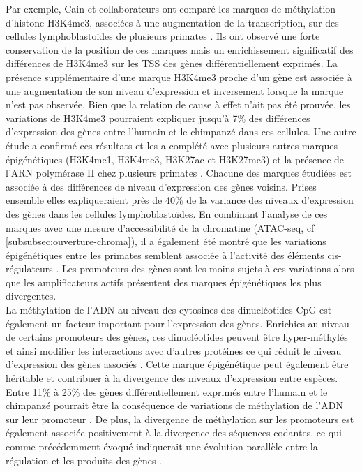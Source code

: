 Par exemple, Cain et collaborateurs ont comparé les marques de méthylation d’histone H3K4me3, associées à une augmentation de la transcription, sur des cellules lymphoblastoïdes de plusieurs primates \citep{cain_gene_2011}. Ils ont observé une forte conservation de la position de ces marques mais un enrichissement significatif des différences de H3K4me3 sur les \acrshort{TSS} des gènes différentiellement exprimés. La présence supplémentaire d’une marque H3K4me3 proche d’un gène est associée à une augmentation de son niveau d’expression et inversement lorsque la marque n’est pas observée. Bien que la relation de cause à effet n'ait pas été prouvée, les variations de H3K4me3 pourraient expliquer jusqu’à 7\% des différences d’expression des gènes entre l’humain et le chimpanzé dans ces cellules. Une autre étude a confirmé ces résultats et les a complété avec plusieurs autres marques épigénétiques (H3K4me1, H3K4me3, H3K27ac et H3K27me3) et la présence de l’ARN polymérase II chez plusieurs primates \citep{zhou_epigenetic_2014}. Chacune des marques étudiées est associée à des différences de niveau d’expression des gènes voisins. Prises ensemble elles expliqueraient près de 40\% de la variance des niveaux d’expression des gènes dans les cellules lymphoblastoïdes. En combinant l’analyse de ces marques avec une mesure d’accessibilité de la chromatine (ATAC-seq, cf \ref{subsubsec:ouverture-chroma}), il a également été montré que les variations épigénétiques entre les primates semblent associée à l’activité des éléments \gls{cis}-régulateurs \citep{garcia-perez_epigenomic_2021}. Les promoteurs des gènes sont les moins sujets à ces variations alors que les \glspl{amplificateur} actifs présentent des marques épigénétiques les plus divergentes. \\

La méthylation de l’ADN au niveau des cytosines des dinucléotides \acrshort{CpG} est également un facteur important pour l’expression des gènes. Enrichies au niveau de certains promoteurs des gènes, ces dinucléotides peuvent être hyper-méthylés et ainsi modifier les interactions avec d’autres protéines ce qui réduit le niveau d’expression des gènes associés \citep{jones_role_2001}. Cette marque épigénétique peut également être héritable et contribuer à la divergence des niveaux d’expression entre espèces. Entre 11\% à 25\% des gènes différentiellement exprimés entre l’humain et le chimpanzé pourrait être la conséquence de variations de méthylation de l’ADN sur leur promoteur \citep{pai_genome-wide_2011, blake_comparison_2020}. De plus, la divergence de méthylation sur les promoteurs est également associée positivement à la divergence des séquences codantes, ce qui comme précédemment évoqué indiquerait une évolution parallèle entre la régulation et les produits des gènes \citep{hernando-herraez_dynamics_2013}. \\

